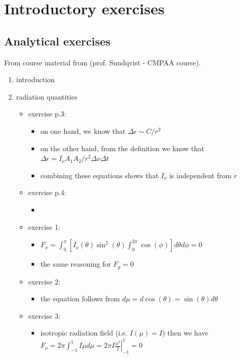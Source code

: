 \documentclass[../main/main.tex]{subfiles}
\begin{document}
\newpage
\section{Introductory exercises}

\subsection{Analytical exercises}
From course material from (prof. Sundqvist - CMPAA course).

\begin{enumerate}
\item introduction
\item radiation quantities
\begin{itemize}

\item exercise p.3: 
\begin{itemize}
\item on one hand, we know that $\Delta \epsilon \sim C/r^2 $
\item on the other hand, from the definition we know  that $\Delta \epsilon = I_{\nu} A_1 A_2/r^2 \Delta \nu \Delta t$
\item combining these equations shows that $I_{\nu}$ is independent from $r$
\end{itemize}

\item exercise p.4:
\begin{itemize}
\item 
\end{itemize}

\item exercise 1:
\begin{itemize}
\item $F_x =  \int_0^{\pi} \left[ I_{\nu}(\theta)\sin^2(\theta) \int_0^{2 \pi}\cos(\phi) \right] d\theta d \phi = 0 $
\item the same reasoning for $F_y = 0$
\end{itemize}

\item exercise 2:
\begin{itemize}
\item the equation follows from $d\mu = d\cos(\theta) = \sin(\theta) d\theta$
\end{itemize}

\item exercise 3: 
\begin{itemize}
\item isotropic radiation field (i.e. $I(\mu) = I$) then we have $F_{\nu} = 2 \pi  \int_{-1}^{1} I \mu d\mu = 2 \pi I \left. \frac{x^2}{2}\right \rvert_
{-1}^{1} = 0$
\end{itemize}


\end{itemize}
\end{enumerate}
\end{document}
